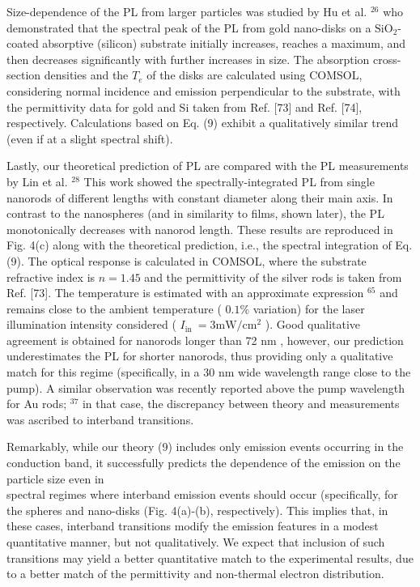\documentclass[10pt]{article}
\begin{document}
Size-dependence of the PL from larger particles was studied by Hu et al. ${ }^{26}$ who demonstrated that the spectral peak of the PL from gold nano-disks on a $\mathrm{SiO}_{2}$-coated absorptive (silicon) substrate initially increases, reaches a maximum, and then decreases significantly with further increases in size. The absorption cross-section densities and the $T_{e}$ of the disks are calculated using COMSOL, considering normal incidence and emission perpendicular to the substrate, with the permittivity data for gold and Si taken from Ref. [73] and Ref. [74], respectively. Calculations based on Eq. (9) exhibit a qualitatively similar trend (even if at a slight spectral shift).

Lastly, our theoretical prediction of PL are compared with the PL measurements by Lin et al. ${ }^{28}$ This work showed the spectrally-integrated PL from single nanorods of different lengths with constant diameter along their main axis. In contrast to the nanospheres (and in similarity to films, shown later), the PL monotonically decreases with nanorod length. These results are reproduced in Fig. 4(c) along with the theoretical prediction, i.e., the spectral integration of Eq. (9). The optical response is calculated in COMSOL, where the substrate refractive index is $n=1.45$ and the permittivity of the silver rods is taken from Ref. [73]. The temperature is estimated with an approximate expression ${ }^{65}$ and remains close to the ambient temperature ( $0.1 \%$ variation) for the laser illumination intensity considered ( $I_{\text {in }}=3 \mathrm{mW} / \mathrm{cm}^{2}$ ). Good qualitative agreement is obtained for nanorods longer than 72 nm , however, our prediction underestimates the PL for shorter nanorods, thus providing only a qualitative match for this regime (specifically, in a 30 nm wide wavelength range close to the pump). A similar observation was recently reported above the pump wavelength for Au rods; ${ }^{37}$ in that case, the discrepancy between theory and measurements was ascribed to interband transitions.

Remarkably, while our theory (9) includes only emission events occurring in the conduction band, it successfully predicts the dependence of the emission on the particle size even in\\
spectral regimes where interband emission events should occur (specifically, for the spheres and nano-disks (Fig. 4(a)-(b), respectively). This implies that, in these cases, interband transitions modify the emission features in a modest quantitative manner, but not qualitatively. We expect that inclusion of such transitions may yield a better quantitative match to the experimental results, due to a better match of the permittivity and non-thermal electron distribution.
\end{document}
